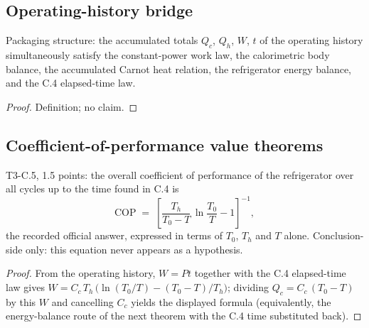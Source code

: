 \subsection*{Operating-history bridge}

\begin{definition}
\label{def:IPhO2026Problems_problem_IPhO_2026_3_C_5:OperatingHistory}
Packaging structure: the accumulated totals $Q_c$, $Q_h$, $W$, $t$ of the
operating history simultaneously satisfy the constant-power work law, the
calorimetric body balance, the accumulated Carnot heat relation, the
refrigerator energy balance, and the C.4 elapsed-time law.
\end{definition}
\begin{proof}
Definition; no claim.
\end{proof}

\subsection*{Coefficient-of-performance value theorems}

\begin{theorem}
\label{thm:IPhO2026Problems_problem_IPhO_2026_3_C_5:overall_coefficient_of_performance}
T3-C.5, 1.5 points: the overall coefficient of performance of the
refrigerator over all cycles up to the time found in C.4 is
\[ \mathrm{COP} \;=\; \left[\frac{T_h}{T_0 - T}\,\ln\!\frac{T_0}{T} - 1\right]^{-1},\]
the recorded official answer, expressed in terms of $T_0$, $T_h$ and $T$
alone. Conclusion-side only: this equation never appears as a hypothesis.
\end{theorem}
\begin{proof}
From the operating history, $W = P t$ together with the C.4 elapsed-time law
gives $W = C_c\,T_h\,\bigl(\ln(T_0/T) - (T_0 - T)/T_h\bigr)$; dividing
$Q_c = C_c\,(T_0 - T)$ by this $W$ and cancelling $C_c$ yields the displayed
formula (equivalently, the energy-balance route of the next theorem with the
C.4 time substituted back).
\end{proof}

